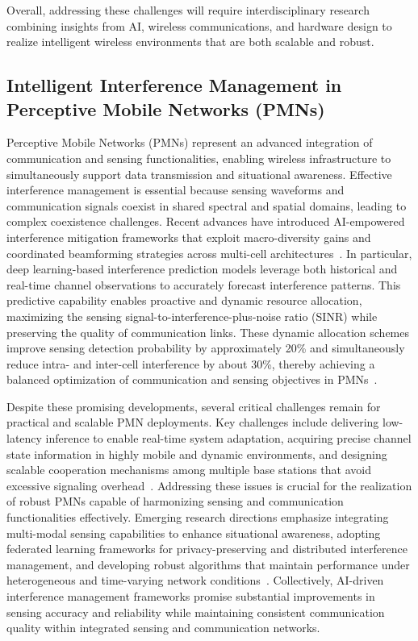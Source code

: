 \documentclass[sigconf]{acmart}
\begin{document}
Overall, addressing these challenges will require interdisciplinary research combining insights from AI, wireless communications, and hardware design to realize intelligent wireless environments that are both scalable and robust.

\subsection{Intelligent Interference Management in Perceptive Mobile Networks (PMNs)}

Perceptive Mobile Networks (PMNs) represent an advanced integration of communication and sensing functionalities, enabling wireless infrastructure to simultaneously support data transmission and situational awareness. Effective interference management is essential because sensing waveforms and communication signals coexist in shared spectral and spatial domains, leading to complex coexistence challenges. Recent advances have introduced AI-empowered interference mitigation frameworks that exploit macro-diversity gains and coordinated beamforming strategies across multi-cell architectures~\cite{ref48}. In particular, deep learning-based interference prediction models leverage both historical and real-time channel observations to accurately forecast interference patterns. This predictive capability enables proactive and dynamic resource allocation, maximizing the sensing signal-to-interference-plus-noise ratio (SINR) while preserving the quality of communication links. These dynamic allocation schemes improve sensing detection probability by approximately 20\% and simultaneously reduce intra- and inter-cell interference by about 30\%, thereby achieving a balanced optimization of communication and sensing objectives in PMNs~\cite{ref48}.

Despite these promising developments, several critical challenges remain for practical and scalable PMN deployments. Key challenges include delivering low-latency inference to enable real-time system adaptation, acquiring precise channel state information in highly mobile and dynamic environments, and designing scalable cooperation mechanisms among multiple base stations that avoid excessive signaling overhead~\cite{ref48}. Addressing these issues is crucial for the realization of robust PMNs capable of harmonizing sensing and communication functionalities effectively. Emerging research directions emphasize integrating multi-modal sensing capabilities to enhance situational awareness, adopting federated learning frameworks for privacy-preserving and distributed interference management, and developing robust algorithms that maintain performance under heterogeneous and time-varying network conditions~\cite{ref48}. Collectively, AI-driven interference management frameworks promise substantial improvements in sensing accuracy and reliability while maintaining consistent communication quality within integrated sensing and communication networks.
\end{document}
